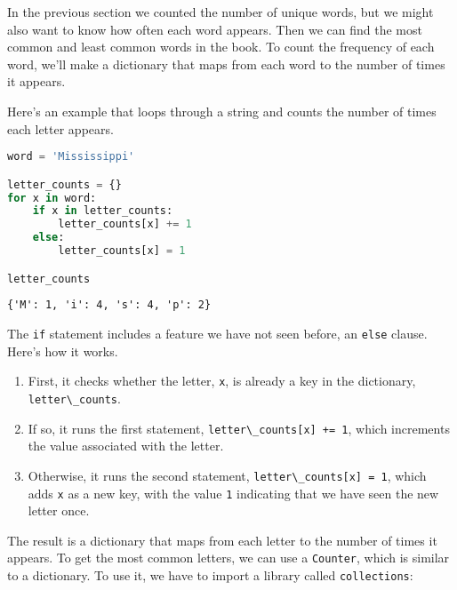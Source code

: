 In the previous section we counted the number of unique words, but we
might also want to know how often each word appears. Then we can find
the most common and least common words in the book. To count the
frequency of each word, we'll make a dictionary that maps from each word
to the number of times it appears.

Here's an example that loops through a string and counts the number of
times each letter appears.

\begin{lstlisting}[language=Python,style=source]
word = 'Mississippi'

letter_counts = {}
for x in word:
    if x in letter_counts:
        letter_counts[x] += 1
    else:
        letter_counts[x] = 1

letter_counts
\end{lstlisting}

\begin{lstlisting}[style=output]
{'M': 1, 'i': 4, 's': 4, 'p': 2}
\end{lstlisting}

The \passthrough{\lstinline!if!} statement includes a feature we have
not seen before, an \passthrough{\lstinline!else!} clause. Here's how it
works.

\begin{enumerate}
\def\labelenumi{\arabic{enumi}.}
\item
  First, it checks whether the letter, \passthrough{\lstinline!x!}, is
  already a key in the dictionary,
  \passthrough{\lstinline!letter\_counts!}.
\item
  If so, it runs the first statement,
  \passthrough{\lstinline!letter\_counts[x] += 1!}, which increments the
  value associated with the letter.
\item
  Otherwise, it runs the second statement,
  \passthrough{\lstinline!letter\_counts[x] = 1!}, which adds
  \passthrough{\lstinline!x!} as a new key, with the value
  \passthrough{\lstinline!1!} indicating that we have seen the new
  letter once.
\end{enumerate}

The result is a dictionary that maps from each letter to the number of
times it appears. To get the most common letters, we can use a
\passthrough{\lstinline!Counter!}, which is similar to a dictionary. To
use it, we have to import a library called
\passthrough{\lstinline!collections!}:

